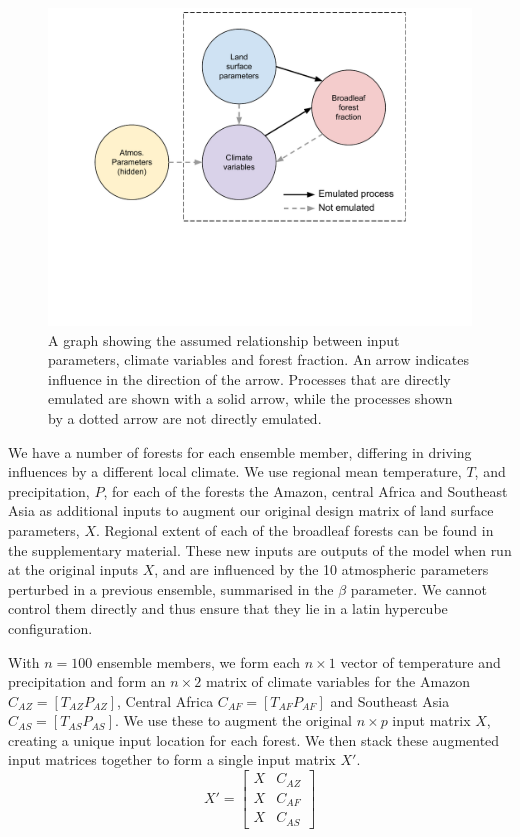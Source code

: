 \documentclass[gmd, manuscript]{copernicus}
\begin{document}
\begin{figure}[t]
\includegraphics[width=12cm]{../graphics/dag.pdf}
\caption{A graph showing the assumed relationship between input parameters, climate variables and forest fraction. An arrow indicates influence in the direction of the arrow. Processes that are directly emulated are shown with a solid arrow, while the processes shown by a dotted arrow are not directly emulated. 
}
\label{fig:dag}
\end{figure}

We have a number of forests for each ensemble member, differing in driving influences by a different local climate. We use regional mean temperature, $T$, and precipitation, $P$, for each of the forests the Amazon, central Africa and Southeast Asia as additional inputs to augment our original design matrix of land surface parameters, $X$. Regional extent of each of the broadleaf forests can be found in the supplementary material. These new inputs are outputs of the model when run at the original inputs $X$, and are influenced by the 10 atmospheric parameters perturbed in a previous ensemble, summarised in the $\beta$ parameter. We cannot control them directly and thus ensure that they lie in a latin hypercube configuration. 

With $n = 100$ ensemble members, we form each  $n \times 1$ vector of temperature and precipitation and form an $n \times 2$  matrix of climate variables for the Amazon $C_{AZ} = [T_{AZ} P_{AZ}]$, Central Africa $C_{AF}=[T_{AF} P_{AF}]$ and Southeast Asia $C_{AS} = [T_{AS} P_{AS}]$. We use these to augment the original $n \times p$ input matrix $X$, creating a unique input location for each forest. We then stack these augmented input matrices together to form a single input matrix $X'$.
\begin{equation}
X' = \begin{bmatrix}
X & C_{AZ} \\
X & C_{AF}  \\
X & C_{AS}
\end{bmatrix}
\end{equation}
\end{document}
